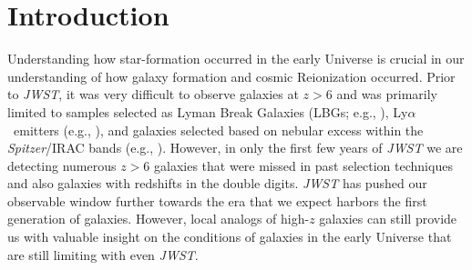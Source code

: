 \documentclass[twocolumn,tight,times,linenumbers]{aastex631}
\newcommand{\lya}{Ly$\alpha$}
\begin{document}
		
		
		
		
		\section{Introduction}
            Understanding how star-formation occurred in the early Universe is crucial in our understanding of how galaxy formation and cosmic Reionization occurred. Prior to \textit{JWST}, it was very difficult to observe galaxies at $z > 6$ and was primarily limited to samples selected as Lyman Break Galaxies (LBGs; e.g., \citealt{Bouwens2011,McLure2013,Oesch2014,McLeod2016,Ishigaki2018,Finkelstein2022}), \lya~emitters (e.g., \citealt{Rhoads2000,Malhotra2004,Dawson2007,Matthee2014,Santos2016,Konno2018,Sobral2018,Taylor2020,Goto2021,Wold2022,Torralba2024}), and galaxies selected based on nebular excess within the \textit{Spitzer}/IRAC bands (e.g., \citealt{Shim2011,Smit2015,Faisst2016_EW,Marmol2016,Rasappu2016,deBarros2019,Lam2019,Endsley2021_EW}). However, in only the first few years of \textit{JWST} we are detecting numerous $z > 6$ galaxies that were missed in past selection techniques and also galaxies with redshifts in the double digits. \textit{JWST} has pushed our observable window further towards the era that we expect harbors the first generation of galaxies. However, local analogs of high-$z$ galaxies can still provide us with valuable insight on the conditions of galaxies in the early Universe that are still limiting with even \textit{JWST}. 
            
\end{document}
